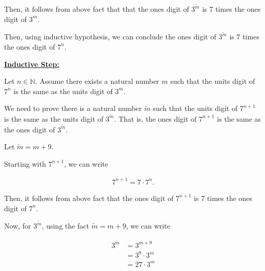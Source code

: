 \documentclass[12pt]{article}
\begin{document}
\begin{itemize}
\begin{mdframed}
\begin{enumerate}[1.]
\begin{itemize}
\begin{mdframed}
                Then, it follows from above fact that that the ones digit of $3^{\tilde{m}}$
                is 7 times the ones digit of $3^m$.

                \bigskip

                Then, using inductive hypothesis, we can conclude the ones digit of $3^{\tilde{m}}$
                is 7 times the ones digit of $7^n$.
                \end{mdframed}

            \end{itemize}

            \begin{mdframed}

            \underline{\textbf{Inductive Step:}}

            \bigskip

            Let $n \in \mathbb{N}$. Assume there exists a natural number $m$ such that
            the units digit of $7^n$ is the same as the units digit of $3^m$.

            \bigskip

            We need to prove there is a natural number $\tilde{m}$ such that the
            units digit of $7^{n+1}$ is the same as the units digit of $3^{\tilde{m}}$.
            That is, the ones digit of $7^{n+1}$ is the same as the ones digit of $3^{\tilde{m}}$.

            \bigskip

            Let $\tilde{m} = m + 9$.

            \bigskip

            Starting with $7^{n+1}$, we can write

            \begin{align}
                7^{n+1} = 7 \cdot 7^n.
            \end{align}

            \bigskip

            Then, it follows from above fact that the ones digit of $7^{n+1}$
            is 7 times the ones digit of $7^n$.

            \bigskip

            Now, for $3^{\tilde{m}}$, using the fact $\tilde{m} = m + 9$, we
            can write

            \begin{align}
                3^{\tilde{m}} &= 3^{m+9}\\
                &= 3^9 \cdot 3^m\\
                &= 27 \cdot 3^m
            \end{align}


\end{mdframed}
\end{enumerate}
\end{mdframed}
\end{itemize}
\end{document}
